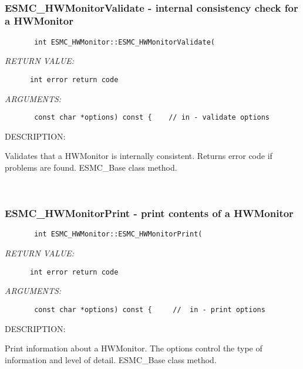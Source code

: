  
\mbox{}\hrulefill\ 
 
\subsubsection{ESMC\_HWMonitorValidate - internal consistency check for a HWMonitor}


  
\begin{verbatim}       int ESMC_HWMonitor::ESMC_HWMonitorValidate(\end{verbatim}{\em RETURN VALUE:}
\begin{verbatim}      int error return code\end{verbatim}{\em ARGUMENTS:}
\begin{verbatim}       const char *options) const {    // in - validate options\end{verbatim}
{\sf DESCRIPTION:\\ }


        Validates that a HWMonitor is internally consistent.
        Returns error code if problems are found.  ESMC\_Base class method.
   
 
\mbox{}\hrulefill\ 
 
\subsubsection{ESMC\_HWMonitorPrint - print contents of a HWMonitor}


  
\begin{verbatim}       int ESMC_HWMonitor::ESMC_HWMonitorPrint(\end{verbatim}{\em RETURN VALUE:}
\begin{verbatim}      int error return code\end{verbatim}{\em ARGUMENTS:}
\begin{verbatim}       const char *options) const {     //  in - print options\end{verbatim}
{\sf DESCRIPTION:\\ }


        Print information about a HWMonitor.  The options control the
        type of information and level of detail.  ESMC\_Base class method.
   
